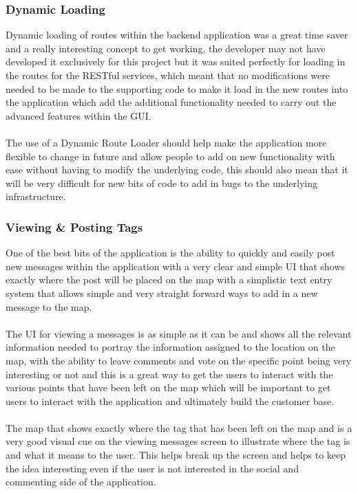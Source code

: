 \subsubsection{Dynamic Loading}

Dynamic loading of routes within the backend application was a great time saver and a really interesting concept to get working, the developer may not have developed it exclusively for this project but it was suited perfectly for loading in the routes for the RESTful services, which meant that no modifications were needed to be made to the supporting code to make it load in the new routes into the application which add the additional functionality needed to carry out the advanced features within the GUI.\\
\\
The use of a Dynamic Route Loader should help make the application more flexible to change in future and allow people to add on new functionality with ease without having to modify the underlying code, this should also mean that it will be very difficult for new bits of code to add in bugs to the underlying infrastructure.

\subsubsection{Viewing \& Posting Tags}
\label{sec:viewing_posting}

One of the best bits of the application is the ability to quickly and easily post new messages within the application with a very clear and simple UI that shows exactly where the post will be placed on the map with a simplistic text entry system that allows simple and very straight forward ways to add in a new message to the map.\\
\\
The UI for viewing a messages is as simple as it can be and shows all the relevant information needed to portray the information assigned to the location on the map, with the ability to leave comments and vote on the specific point being very interesting or not and this is a great way to get the users to interact with the various points that have been left on the map which will be important to get users to interact with the application and ultimately build the customer base.\\
\\
The map that shows exactly where the tag that has been left on the map and is a very good visual cue on the viewing messages screen to illustrate where the tag is and what it means to the user. This helps break up the screen and helps to keep the idea interesting even if the user is not interested in the social and commenting side of the application.

